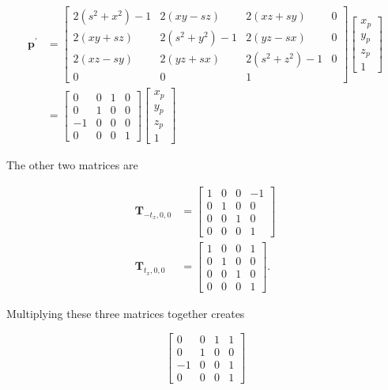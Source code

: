 $$
\begin{aligned}
\mathbf{p}^{\prime} & =\left[\begin{array}{cccc}
2\left(s^{2}+x^{2}\right)-1 & 2(x y-s z) & 2(x z+s y) & 0 \\
2(x y+s z) & 2\left(s^{2}+y^{2}\right)-1 & 2(y z-s x) & 0 \\
2(x z-s y) & 2(y z+s x) & 2\left(s^{2}+z^{2}\right)-1 & 0 \\
0 & 0 & 1
\end{array}\right]\left[\begin{array}{c}
x_{p} \\
y_{p} \\
z_{p} \\
1
\end{array}\right] \\
& =\left[\begin{array}{cccc}
0 & 0 & 1 & 0 \\
0 & 1 & 0 & 0 \\
-1 & 0 & 0 & 0 \\
0 & 0 & 0 & 1
\end{array}\right]\left[\begin{array}{c}
x_{p} \\
y_{p} \\
z_{p} \\
1
\end{array}\right]
\end{aligned}
$$

The other two matrices are

$$
\begin{aligned}
\mathbf{T}_{-t_{x}, 0,0} & =\left[\begin{array}{cccc}
1 & 0 & 0 & -1 \\
0 & 1 & 0 & 0 \\
0 & 0 & 1 & 0 \\
0 & 0 & 0 & 1
\end{array}\right] \\
\mathbf{T}_{t_{x}, 0,0} & =\left[\begin{array}{llll}
1 & 0 & 0 & 1 \\
0 & 1 & 0 & 0 \\
0 & 0 & 1 & 0 \\
0 & 0 & 0 & 1
\end{array}\right] .
\end{aligned}
$$

Multiplying these three matrices together creates

$$
\left[\begin{array}{cccc}
0 & 0 & 1 & 1 \\
0 & 1 & 0 & 0 \\
-1 & 0 & 0 & 1 \\
0 & 0 & 0 & 1
\end{array}\right]
$$

